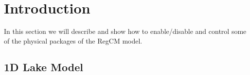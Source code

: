 %
%

\section{Introduction}

In this section we will describe and show how to enable/disable and control
some of the physical packages of the RegCM model.

\subsection{1D Lake Model}
\label{lakemodel}


